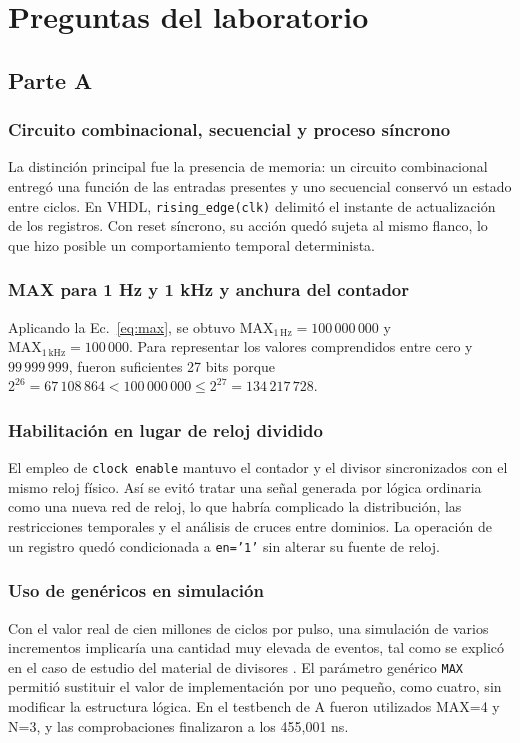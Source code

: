 \section{Preguntas del laboratorio}
\subsection{Parte A}
\subsubsection{Circuito combinacional, secuencial y proceso síncrono}
La distinción principal fue la presencia de memoria: un circuito combinacional entregó una función de las entradas presentes y uno secuencial conservó un estado entre ciclos. En VHDL, \texttt{rising\_edge(clk)} delimitó el instante de actualización de los registros. Con reset síncrono, su acción quedó sujeta al mismo flanco, lo que hizo posible un comportamiento temporal determinista.

\subsubsection{MAX para 1 Hz y 1 kHz y anchura del contador}
Aplicando la Ec.~\eqref{eq:max}, se obtuvo \(\mathrm{MAX}_{1\,\mathrm{Hz}}=100\,000\,000\) y \(\mathrm{MAX}_{1\,\mathrm{kHz}}=100\,000\). Para representar los valores comprendidos entre cero y \(99\,999\,999\), fueron suficientes 27 bits porque \(2^{26}=67\,108\,864<100\,000\,000\leq 2^{27}=134\,217\,728\).

\subsubsection{Habilitación en lugar de reloj dividido}
El empleo de \texttt{clock enable} mantuvo el contador y el divisor sincronizados con el mismo reloj físico. Así se evitó tratar una señal generada por lógica ordinaria como una nueva red de reloj, lo que habría complicado la distribución, las restricciones temporales y el análisis de cruces entre dominios. La operación de un registro quedó condicionada a \texttt{en='1'} sin alterar su fuente de reloj.

\subsubsection{Uso de genéricos en simulación}
Con el valor real de cien millones de ciclos por pulso, una simulación de varios incrementos implicaría una cantidad muy elevada de eventos, tal como se explicó en el caso de estudio del material de divisores \cite{cursodiv}. El parámetro genérico \texttt{MAX} permitió sustituir el valor de implementación por uno pequeño, como cuatro, sin modificar la estructura lógica. En el testbench de A fueron utilizados MAX=4 y N=3, y las comprobaciones finalizaron a los 455,001 ns.

